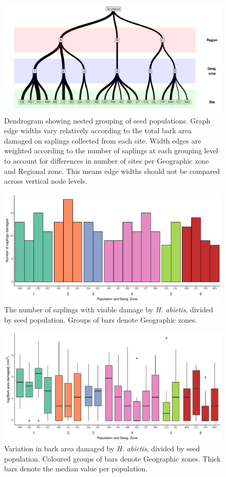 \documentclass[a4paper, 11pt]{article}
\begin{document}
\begin{figure}
	\includegraphics[width=\textwidth]{dendro}
	\caption{Dendrogram showing nested grouping of seed populations. Graph edge widths vary relatively according to the total bark area damaged on saplings collected from each site. Width edges are weighted according to the number of saplings at each grouping level to account for differences in number of sites per Geographic zone and Regional zone. This means edge widths should not be compared across vertical node levels.}
\end{figure}

\begin{figure}
	\includegraphics[width=\textwidth]{barchart}
	\caption{The number of saplings with visible damage by \textit{H. abietis}, divided by seed population. Groups of bars denote Geographic zones.}
	\label{barchart}
\end{figure}

\begin{figure}
	\includegraphics[width=\textwidth]{boxplot}
	\caption{Variation in bark area damaged by \textit{H. abietis}, divided by seed population. Coloured groups of bars denote Geographic zones. Thick bars denote the median value per population.}
	\label{boxplot}
\end{figure}
\end{document}

